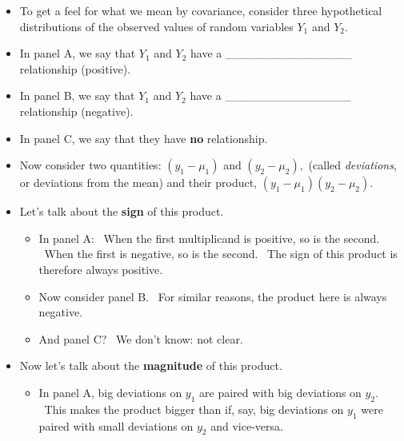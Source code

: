 \documentclass[11pt]{article}
\begin{document}
\begin{itemize}
\item To get a feel for what we mean by covariance, consider three
hypothetical distributions of the observed values of random variables $Y_{1}$
and $Y_{2}.$


\item In panel A, we say that $Y_{1}$ and $Y_{2}$ have a
\_\_\_\_\_\_\_\_\_\_\_\_\_\_\_ relationship (positive).

\item In panel B, we say that $Y_{1}$ and $Y_{2}$ have a
\_\_\_\_\_\_\_\_\_\_\_\_\_\_\_ relationship (negative).

\item In panel C, we say that they have \textbf{no }relationship.

\item Now consider two quantities: $(y_{1}-\mu _{1})$ and $(y_{2}-\mu _{2}),$%
(called \textit{deviations}, or deviations from the mean) and their product, 
$(y_{1}-\mu _{1})(y_{2}-\mu _{2}).$

\item Let's talk about the \textbf{sign }of this product.

\begin{itemize}
\item In panel A: \ When the first multiplicand is positive, so is the
second. \ When the first is negative, so is the second. \ The sign of this
product is therefore always positive.

\item Now consider panel B. \ For similar reasons, the product here is
always negative.

\item And panel C? \ We don't know: not clear.
\end{itemize}

\item Now let's talk about the \textbf{magnitude} of this product.

\begin{itemize}
\item In panel A, big deviations on $y_{1}$ are paired with big deviations
on $y_{2}$. \ This makes the product bigger than if, say, big deviations on $%
y_{1}$ were paired with small deviations on $y_{2}$ and vice-versa.


\end{itemize}
\end{itemize}
\end{document}
